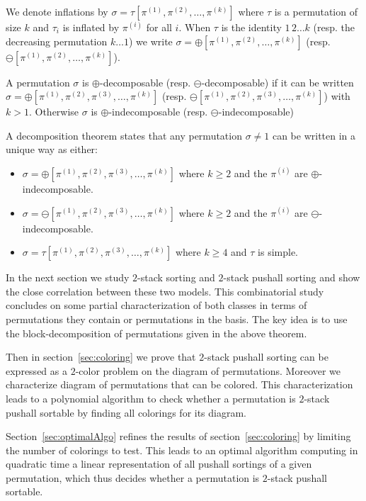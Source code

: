 \documentclass[11pt]{article}
\newcommand{\pushall}{$2$-stack pushall sortable\xspace}
\begin{document}
We denote inflations by $\sigma = \tau[\pi^{(1)},\pi^{(2)},\ldots,\pi^{(k)}]$ where $\tau$ is a permutation of size $k$ and $\tau_i$ is inflated by $\pi^{(i)}$ for all $i$.
When $\tau$ is the identity $1\, 2 \dots k$ (resp. the decreasing permutation $k \dots 1$) we write $\sigma = \oplus[\pi^{(1)}, \pi^{(2)}, \ldots, \pi^{(k)}]$ (resp. $\ominus[\pi^{(1)}, \pi^{(2)}, \ldots, \pi^{(k)}]$).

A permutation $\sigma$ is $\oplus$-decomposable (resp. $\ominus$-decomposable) if it can be written
$\sigma = \oplus[\pi^{(1)},\pi^{(2)},\pi^{(3)},\ldots,\pi^{(k)}]$
(resp.  $\ominus[\pi^{(1)},\pi^{(2)},\pi^{(3)},\ldots,\pi^{(k)}]$) with $k > 1$.
Otherwise $\sigma$ is $\oplus$-indecomposable (resp. $\ominus$-indecomposable)

A decomposition theorem \cite{AA05} states that any permutation $\sigma\neq1$ can be written in a unique way as either:
\begin{itemize}
\item $\sigma = \oplus[\pi^{(1)},\pi^{(2)},\pi^{(3)},\ldots,\pi^{(k)}]$ where $k \geq 2$ and the $\pi^{(i)}$ are $\oplus$-indecomposable.
\item $\sigma = \ominus[\pi^{(1)},\pi^{(2)},\pi^{(3)},\ldots,\pi^{(k)}]$ where $k \geq 2$ and the $\pi^{(i)}$ are $\ominus$-indecomposable.
\item$\sigma = \tau[\pi^{(1)},\pi^{(2)},\pi^{(3)},\ldots,\pi^{(k)}]$ where $k\geq 4$ and $\tau$ is simple.
\end{itemize}

In the next section we study $2$-stack sorting and $2$-stack pushall sorting and show the close correlation between these two models. 
This combinatorial study concludes on some partial characterization of both classes in terms of permutations they contain or permutations in the basis.
The key idea is to use the block-decomposition of permutations given in the above theorem. 

Then in section~\ref{sec:coloring} we prove that $2$-stack pushall sorting can be expressed as a $2$-color problem on the diagram of permutations.
Moreover we characterize diagram of permutations that can be colored. 
This characterization leads to a polynomial algorithm to check whether a permutation is $2$-stack pushall sortable by finding all colorings for its diagram. 

Section~\ref{sec:optimalAlgo} refines the results of section~\ref{sec:coloring} by limiting the number of colorings to test.
This leads to an optimal algorithm computing in quadratic time a linear representation of all pushall sortings of a given permutation,
which thus decides whether a permutation is \pushall.
\end{document}

